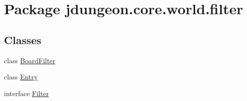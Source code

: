 \hypertarget{namespacejdungeon_1_1core_1_1world_1_1filter}{
\section{Package jdungeon.core.world.filter}
\label{namespacejdungeon_1_1core_1_1world_1_1filter}
}
\subsection*{Classes}
\begin{DoxyCompactItemize}
\item 
class \hyperlink{classjdungeon_1_1core_1_1world_1_1filter_1_1_board_filter}{BoardFilter}
\item 
class \hyperlink{classjdungeon_1_1core_1_1world_1_1filter_1_1_entry}{Entry}
\item 
interface \hyperlink{interfacejdungeon_1_1core_1_1world_1_1filter_1_1_filter}{Filter}
\end{DoxyCompactItemize}
